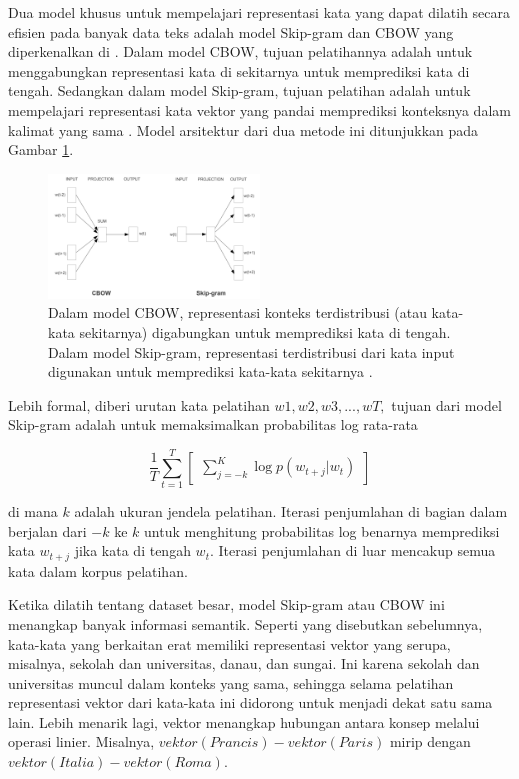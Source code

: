 \documentclass[conference]{IEEEtran}
\begin{document}
	Dua model khusus untuk mempelajari representasi kata yang dapat dilatih secara efisien pada banyak data teks adalah model Skip-gram dan CBOW yang diperkenalkan di \cite{b10}. Dalam model CBOW, tujuan pelatihannya adalah untuk menggabungkan representasi kata di sekitarnya untuk memprediksi kata di tengah. Sedangkan dalam model Skip-gram, tujuan pelatihan adalah untuk mempelajari representasi kata vektor yang pandai memprediksi konteksnya dalam kalimat yang sama \cite{b10}. Model arsitektur dari dua metode ini ditunjukkan pada Gambar \ref{fig:ilustrasi_cbow_skip_gram}.

	\begin{figure}[htbp]
	    \centerline{
	    \includegraphics[width=0.5\textwidth]{resources/cbow-skip-gram-illustration.png}}
	    \caption[Ilustrasi model CBOW dan Skip-gram.]{ Dalam model CBOW, representasi konteks terdistribusi (atau kata-kata sekitarnya) digabungkan untuk memprediksi kata di tengah. Dalam model Skip-gram, representasi terdistribusi dari kata input digunakan untuk memprediksi kata-kata sekitarnya \cite{b12}.}
	    \label{fig:ilustrasi_cbow_skip_gram}
	\end{figure}

	Lebih formal, diberi urutan kata pelatihan \(w1, w2, w3,. . . , wT,\) tujuan dari model Skip-gram adalah untuk memaksimalkan probabilitas log rata-rata

	\begin{equation}
	    \frac{1}{T}\sum_{t=1}^{T}\begin{bmatrix}
	    \sum_{j=-k}^{K}{\log p(w_{t+j}|w_{t})}
	    \end{bmatrix}
	    \label{eq:1}
	\end{equation}

	di mana \(k\) adalah ukuran jendela pelatihan. Iterasi penjumlahan di bagian dalam berjalan dari \({-k}\) ke \(k\) untuk menghitung probabilitas log benarnya memprediksi kata \(w_{t+j}\) jika kata di tengah \(w_{t}\). Iterasi penjumlahan di luar mencakup semua kata dalam korpus pelatihan. 

	Ketika dilatih tentang dataset besar, model Skip-gram atau CBOW ini menangkap banyak informasi semantik. Seperti yang disebutkan sebelumnya, kata-kata yang berkaitan erat memiliki representasi vektor yang serupa, misalnya, sekolah dan universitas, danau, dan sungai. Ini karena sekolah dan universitas muncul dalam konteks yang sama, sehingga selama pelatihan representasi vektor dari kata-kata ini didorong untuk menjadi dekat satu sama lain. Lebih menarik lagi, vektor menangkap hubungan antara konsep melalui operasi linier. Misalnya, \(vektor(Prancis) - vektor(Paris)\) mirip dengan \(vektor(Italia) - vektor(Roma)\).
\end{document}
